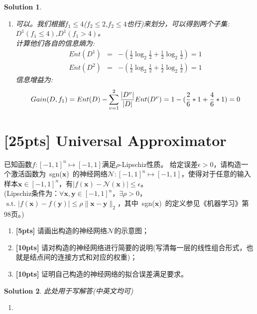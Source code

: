 \documentclass[a4paper,UTF8]{article}
\numberwithin{equation}{section}
\newtheorem*{solution}{Solution}
\begin{document}
\begin{solution}
\begin{enumerate}[ {(}1{)}]
 		\item 可以。我们根据$f_1 \leq 4$($f_2 \leq 2$,$f_2 \leq 4$也行)来划分，可以得到两个子集:\\
 		$D^1(f_1 \leq 4)$,$D^1(f_1 > 4)$。\\
 		计算他们各自的信息熵为:\\
 		\begin{equation*}
 		\begin{aligned}
		Ent(D^1)&=&-(\frac{1}{2}\log_2{\frac{1}{2}}+\frac{1}{2}\log_2{\frac{1}{2}})=1\\	Ent(D^2)&=&-(\frac{1}{2}\log_2{\frac{1}{2}}+\frac{1}{2}\log_2{\frac{1}{2}})=1
 		\end{aligned}			
 		\end{equation*}
 		信息增益为:
 		$$Gain(D,f_1) = Ent(D)-\sum_{v=1}^2{\frac{|D^v|}{|D|}Ent(D^v)}\\
 		=1-(\frac{2}{6}*1+\frac{4}{6}*1)=0$$
 	\end{enumerate}
 \end{solution}
\newpage

 \section{[25pts] Universal Approximator}
 已知函数$f:[-1, 1]^n \mapsto [-1, 1]$满足$\rho$-Lipschiz性质。 给定误差$\epsilon > 0$，请构造一个激活函数为\mbox{ sgn($\mathbf{x}$) }的神经网络$ \mathcal{N}:[-1,1]^n \mapsto [-1,1] $，使得对于任意的输入样本$ \mathbf{x} \in [-1,1]^n $，有$|f(\mathbf{x}) - \mathcal{N}(\mathbf{x})| \leq \epsilon$。\\
 (Lipschiz条件为：$ \forall \mathbf{x}, \mathbf{y} \in [-1,1]^n$，$ \exists \rho > 0$，$ \mbox{ s.t. } |f(\mathbf{x})-f(\mathbf{y})| \leq \rho \lVert \mathbf{x} - \mathbf{y} \rVert_2 $，其中\mbox{ sgn($\mathbf{x}$) }的定义参见《机器学习》第98页。)
 
  \begin{enumerate}[ {(}1{)}]
 	\item \textbf{[5pts]} 请画出构造的神经网络$\mathcal{N}$的示意图；
 	
 	\item \textbf{[10pts]} 请对构造的神经网络进行简要的说明(写清每一层的线性组合形式，也就是结点间的连接方式和对应的权重)；
 	
 	\item \textbf{[10pts]} 证明自己构造的神经网络的拟合误差满足要求。
 \end{enumerate}


 \begin{solution}
	此处用于写解答(中英文均可)
	\begin{enumerate}[ {(}1{)}]
		\item 
	\end{enumerate}
 \end{solution}
\newpage
\end{document}
